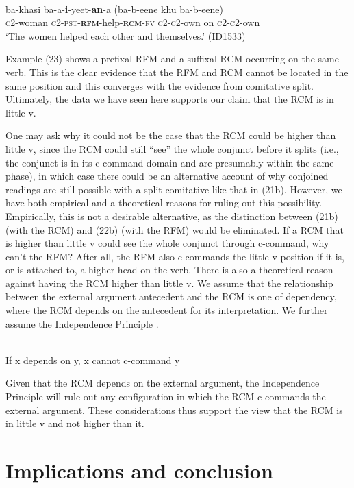 \documentclass[output=paper]{langsci/langscibook}
\begin{document}
\ea\label{ex:}
  \\
\gll ba-khasi   ba-a-\textbf{i}-yeet-\textbf{an}-a     (ba-b-eene khu ba-b-eene) \\
\textsc{c}2-woman   \textsc{c2-pst-}\textbf{\textsc{rfm}}-help-\textbf{\textsc{rcm}}\textsc{-fv}   \textsc{c2-c}2-own on  \textsc{c2-c2}-own\\
\glt ‘The women helped each other and themselves.’ (ID1533)
\z


Example (23) shows a prefixal RFM and a suffixal RCM occurring on the same verb. This is the clear evidence that the RFM and RCM cannot be located in the same position and this converges with the evidence from comitative split. Ultimately, the data we have seen here supports our claim that the RCM is in little v. 

  One may ask why it could not be the case that the RCM could be higher than little v, since the RCM could still “see” the whole conjunct before it splits (i.e., the conjunct is in its c-command domain and are presumably within the same phase), in which case there could be an alternative account of why conjoined readings are still possible with a split comitative like that in (21b). However, we have both empirical and a theoretical reasons for ruling out this possibility. Empirically, this is not a desirable alternative, as the distinction between (21b) (with the RCM) and (22b) (with the RFM) would be eliminated. If a RCM that is higher than little v could see the whole conjunct through c-command, why can't the RFM? After all, the RFM also c-commands the little v position if it is, or is attached to, a higher head on the verb. There is also a theoretical reason against having the RCM higher than little v. We assume that the relationship between the external argument antecedent and the RCM is one of dependency, where the RCM depends on the antecedent for its interpretation. We further assume the Independence Principle \citep{Safir2004}. 


\ea\label{ex:}
\\
  If x depends on y, x cannot c-command y
\z

Given that the RCM depends on the external argument, the Independence Principle will rule out any configuration in which the RCM c-commands the external argument. These considerations thus support the view that the RCM is in little v and not higher than it. 

\section{Implications and conclusion}
\end{document}
